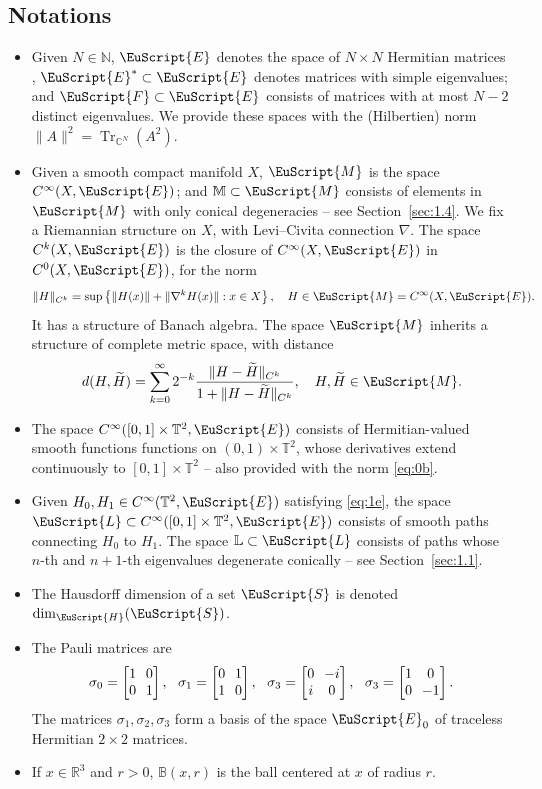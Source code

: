 \documentclass[10pt]{amsart}
\let\pazocal\EuScript
\let\sep:
\theoremstyle{definition}
\DeclareMathOperator{\Tr}{Tr}
\newcommand{\FF}{\pazocal{F}}
\newcommand{\EE}{\pazocal{E}}
\newcommand{\MM}{\pazocal{M}}
\newcommand{\LL}{{\pazocal{L}}}
\newcommand{\HH}{\pazocal{H}}
\newcommand{\SSS}{{\pazocal{S}}}
\newcommand{\Bb}{\mathbb{B}}
\newcommand{\C}{\mathbb{C}}
\newcommand{\Ll}{\mathbb{L}}
\newcommand{\R}{\mathbb{R}}
\newcommand{\N}{\mathbb{N}}
\newcommand{\Mm}{\mathbb{M}}
\newcommand{\Tt}{{\mathbb{T}}}
\newcommand{\tH}{{\widetilde{H}}}
\newcommand{\matrice}[1]{\arraycolsep3.5pt\begin{bmatrix}#1\end{bmatrix}}
\let\Subsection\subsection\let\Subsubsection\subsubsection
\begin{document}
\Subsection{Notations}\label{sec:1.6}
\begin{itemize}
\item Given $N \in \N$, $\EE$ denotes the space of $N \times N$ Hermitian matrices , $\EE^* \subset \EE$ denotes matrices with simple eigenvalues; and $\FF \subset \EE$ consists of matrices with at most $N-2$ distinct eigenvalues. We provide these spaces with the (Hilbertien) norm $\|A\|^2 = \Tr_{\C^N}(A^2)$.
\item Given a smooth compact manifold $X$, $\MM$ is the space $C^\infty(X,\EE)$; and $\Mm \subset \MM$ consists of elements in $\MM$ with only conical degeneracies -- see Section~\ref{sec:1.4}. We fix a Riemannian structure on $X$, with Levi--Civita connection $\nabla$. The space $C^k(X,\EE)$ is the closure of $C^\infty(X,\EE)$ in $C^0(X,\EE)$, for the norm
\begin{equation*}
\| H \|_{C^k} = \sup \left\{\| H(x)\| +\| \nabla^k H(x)\|\sep x \in X \right\}, \quad H \in \MM = C^\infty(X,\EE).
\end{equation*}
It has a structure of Banach algebra. The space $\MM$ inherits a structure of complete metric space, with distance
\begin{equation}\label{eq:0b}
d(H,\tH) = \sum_{k=0}^\infty 2^{-k} \dfrac{\| H-\tH \|_{C^k}}{1+\| H-\tH \|_{C^k}}, \quad H, \tH \in \MM.
\end{equation}
\item The space $C^\infty([0,1] \times \Tt^2,\EE)$ consists of Hermitian-valued smooth functions functions on $(0,1) \times \Tt^2$, whose derivatives extend continuously to $[0,1] \times \Tt^2$ -- also provided with the norm \eqref{eq:0b}.
\item Given $H_0, H_1 \in C^\infty(\Tt^2, \EE)$ satisfying \eqref{eq:1e}, the space $\LL \subset C^\infty([0,1] \times \Tt^2,\EE)$ consists of smooth paths connecting $H_0$ to $H_1$. The space $\Ll \subset \LL$ consists of paths whose $n$-th and $n+1$-th eigenvalues degenerate conically -- see Section~\ref{sec:1.1}.
\item The Hausdorff dimension of a set $\SSS$ is denoted $\dim_\HH(\SSS)$.
\item The Pauli matrices are
\begin{equation*}
\sigma_0 = \matrice{1 & 0 \\ 0 & 1}, \ \ \sigma_1 = \matrice{0 & 1 \\ 1 & 0}, \ \ \sigma_3 = \matrice{0 & -i \\ i & 0}, \ \ \sigma_3 = \matrice{1 & 0 \\ 0 & -1}.
\end{equation*}
The matrices $\sigma_1, \sigma_2, \sigma_3$ form a basis of the space $\EE_0$ of traceless Hermitian $2 \times 2$ matrices.
\item If $x \in \R^3$ and $r > 0$, $\Bb(x,r)$ is the ball centered at $x$ of radius $r$.
\end{itemize}
\end{document}
